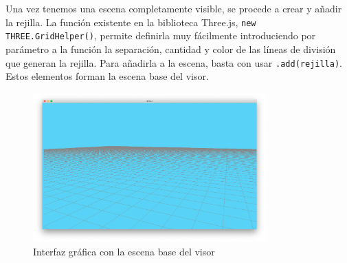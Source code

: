 Una vez tenemos una escena completamente visible, se procede a crear y añadir la rejilla. La función existente en la biblioteca Three.js, \texttt{new THREE.GridHelper()}, permite definirla muy fácilmente introduciendo por parámetro a la función la separación, cantidad y color de las líneas de división que generan la rejilla. Para añadirla a la escena, basta con usar \texttt{.add(rejilla)}. Estos elementos forman la escena base del visor.

\begin{figure}[H]
  \begin{center}
    \includegraphics[width=0.8\textwidth]{figures/interfazinicial.png}
		\caption{Interfaz gráfica con la escena base del visor}
		\label{fig.interfazinicial}
		\end{center}
\end{figure}


